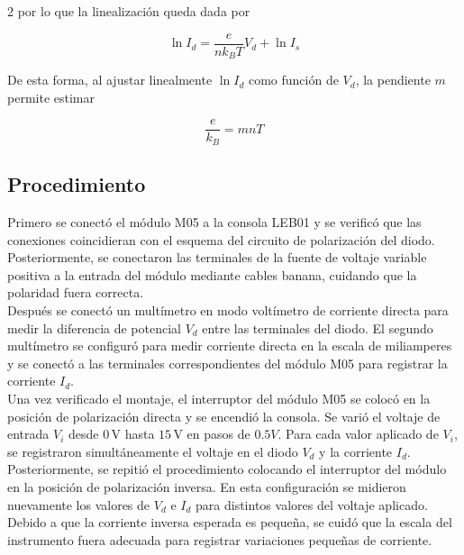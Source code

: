 \documentclass[letterpaper, onecolumn, 12pt]{article} %
\begin{document}
\begin{multicols}{2}
\noindent por lo que la linealización queda dada por

\begin{equation}
    \label{eqlineal}
    \ln I_d =
    \frac{e}{n k_B T} V_d + \ln I_s
\end{equation}

\noindent De esta forma, al ajustar linealmente \(\ln I_d\) como función de \(V_d\), la pendiente \(m\) permite estimar

\begin{equation}
    \frac{e}{k_B} = m n T
\end{equation}

\subsection{Procedimiento}

\noindent Primero se conectó el módulo M05 a la consola LEB01 y se verificó que las conexiones coincidieran con el esquema del circuito de polarización del diodo. Posteriormente, se conectaron las terminales de la fuente de voltaje variable positiva a la entrada del módulo mediante cables banana, cuidando que la polaridad fuera correcta.\\

\noindent Después se conectó un multímetro en modo voltímetro de corriente directa para medir la diferencia de potencial \(V_d\) entre las terminales del diodo. El segundo multímetro se configuró para medir corriente directa en la escala de miliamperes y se conectó a las terminales correspondientes del módulo M05 para registrar la corriente \(I_d\).\\

\noindent Una vez verificado el montaje, el interruptor del módulo M05 se colocó en la posición de polarización directa y se encendió la consola. Se varió el voltaje de entrada \(V_i\) desde \(0\,\mathrm{V}\) hasta \(15\,\mathrm{V}\) en pasos de $0.5V$. Para cada valor aplicado de \(V_i\), se registraron simultáneamente el voltaje en el diodo \(V_d\) y la corriente \(I_d\).\\

\noindent Posteriormente, se repitió el procedimiento colocando el interruptor del módulo en la posición de polarización inversa. En esta configuración se midieron nuevamente los valores de \(V_d\) e \(I_d\) para distintos valores del voltaje aplicado. Debido a que la corriente inversa esperada es pequeña, se cuidó que la escala del instrumento fuera adecuada para registrar variaciones pequeñas de corriente.\\


\end{multicols}
\end{document}
